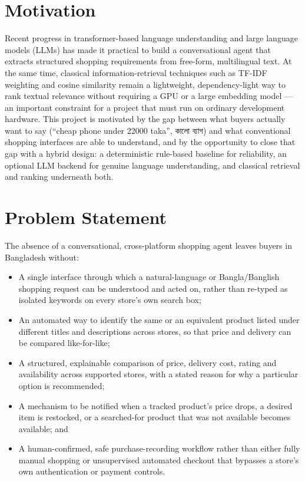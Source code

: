 \documentclass[12pt,a4paper]{report}
\newcommand{\bn}[1]{{\bengalifont #1}}
\begin{document}
\section{Motivation}
Recent progress in transformer-based language understanding and large language models (LLMs) has made it
practical to build a conversational agent that extracts structured shopping requirements from free-form,
multilingual text. At the same time, classical information-retrieval techniques such as TF-IDF weighting
and cosine similarity remain a lightweight, dependency-light way to rank textual relevance without
requiring a GPU or a large embedding model --- an important constraint for a project that must run on
ordinary development hardware. This project is motivated by the gap between what buyers actually want to
say (``cheap phone under 22000 taka'', \bn{কালো ব্যাগ}) and what conventional shopping interfaces are able
to understand, and by the opportunity to close that gap with a hybrid design: a deterministic rule-based
baseline for reliability, an optional LLM backend for genuine language understanding, and classical
retrieval and ranking underneath both.

\section{Problem Statement}
The absence of a conversational, cross-platform shopping agent leaves buyers in Bangladesh without:
\begin{itemize}
\item A single interface through which a natural-language or Bangla/Banglish shopping request can be
understood and acted on, rather than re-typed as isolated keywords on every store's own search box;
\item An automated way to identify the same or an equivalent product listed under different titles and
descriptions across stores, so that price and delivery can be compared like-for-like;
\item A structured, explainable comparison of price, delivery cost, rating and availability across
supported stores, with a stated reason for why a particular option is recommended;
\item A mechanism to be notified when a tracked product's price drops, a desired item is restocked, or a
searched-for product that was not available becomes available; and
\item A human-confirmed, safe purchase-recording workflow rather than either fully manual shopping or
unsupervised automated checkout that bypasses a store's own authentication or payment controls.
\end{itemize}
\end{document}

